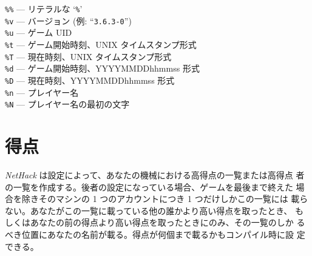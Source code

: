 {\tt \%\%}  --- リテラルな `{\tt \%}'\\
{\tt \%v}  --- バージョン (例: ``{\tt 3.6.3-0}'')\\
{\tt \%u}  --- ゲーム UID\\
{\tt \%t}  --- ゲーム開始時刻、UNIX タイムスタンプ形式\\
{\tt \%T}  --- 現在時刻、UNIX タイムスタンプ形式\\
{\tt \%d}  --- ゲーム開始時刻、YYYYMMDDhhmmss 形式\\
{\tt \%D}  --- 現在時刻、YYYYMMDDhhmmss 形式\\
{\tt \%n}  --- プレイヤー名\\
{\tt \%N}  --- プレイヤー名の最初の文字
\elist

\section{得点}

{\it NetHack\/} は設定によって、あなたの機械における高得点の一覧または高得点
者の一覧を作成する。後者の設定になっている場合、ゲームを最後まで終えた
場合を除きそのマシンの 1 つのアカウントにつき 1 つだけしかこの一覧には
載らない。あなたがこの一覧に載っている他の誰かより高い得点を取ったとき、
もしくはあなたの前の得点より高い得点を取ったときにのみ、その一覧のしか
るべき位置にあなたの名前が載る。得点が何個まで載るかもコンパイル時に設
定できる。

